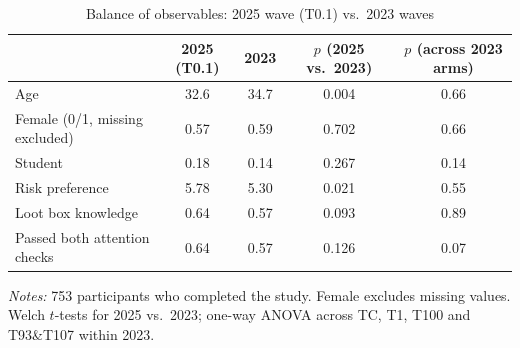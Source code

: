 \begin{table}[!t]
\centering\footnotesize\renewcommand{\arraystretch}{0.92}
\caption{Balance of observables: 2025 wave (T0.1) vs.\ 2023 waves}
\label{tab:balance}
\begin{tabular}{lcccc}
\toprule
 & 2025 (T0.1) & 2023 & $p$ (2025 vs.\ 2023) & $p$ (across 2023 arms) \\
\midrule
Age & 32.6 & 34.7 & 0.004 & 0.66 \\
Female (0/1, missing excluded) & 0.57 & 0.59 & 0.702 & 0.66 \\
Student & 0.18 & 0.14 & 0.267 & 0.14 \\
Risk preference & 5.78 & 5.30 & 0.021 & 0.55 \\
Loot box knowledge & 0.64 & 0.57 & 0.093 & 0.89 \\
Passed both attention checks & 0.64 & 0.57 & 0.126 & 0.07 \\
\bottomrule
\end{tabular}

\smallskip
\begin{minipage}{0.97\textwidth}\footnotesize
\emph{Notes:} 753 participants who completed the study. Female excludes missing values. Welch $t$-tests for 2025 vs.\ 2023; one-way ANOVA across TC, T1, T100 and T93\&T107 within 2023.
\end{minipage}
\end{table}
